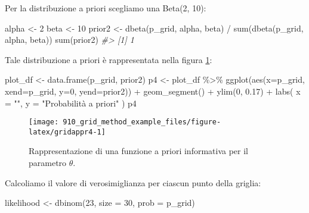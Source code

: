 \documentclass[
]{memoir}
\newenvironment{Shaded}{\begin{snugshade}}{\end{snugshade}}
\newcommand{\AttributeTok}[1]{\textcolor[rgb]{0.77,0.63,0.00}{#1}}
\newcommand{\CommentTok}[1]{\textcolor[rgb]{0.56,0.35,0.01}{\textit{#1}}}
\newcommand{\DecValTok}[1]{\textcolor[rgb]{0.00,0.00,0.81}{#1}}
\newcommand{\FloatTok}[1]{\textcolor[rgb]{0.00,0.00,0.81}{#1}}
\newcommand{\FunctionTok}[1]{\textcolor[rgb]{0.00,0.00,0.00}{#1}}
\newcommand{\NormalTok}[1]{#1}
\newcommand{\OtherTok}[1]{\textcolor[rgb]{0.56,0.35,0.01}{#1}}
\newcommand{\SpecialCharTok}[1]{\textcolor[rgb]{0.00,0.00,0.00}{#1}}
\newcommand{\StringTok}[1]{\textcolor[rgb]{0.31,0.60,0.02}{#1}}
\begin{document}
\noindent
Per la distribuzione a priori scegliamo una Beta(2, 10):

\begin{Shaded}
\begin{Highlighting}[]
\NormalTok{alpha }\OtherTok{\textless{}{-}} \DecValTok{2}
\NormalTok{beta }\OtherTok{\textless{}{-}} \DecValTok{10}
\NormalTok{prior2 }\OtherTok{\textless{}{-}} \FunctionTok{dbeta}\NormalTok{(p\_grid, alpha, beta) }\SpecialCharTok{/} \FunctionTok{sum}\NormalTok{(}\FunctionTok{dbeta}\NormalTok{(p\_grid, alpha, beta))}
\FunctionTok{sum}\NormalTok{(prior2)}
\CommentTok{\#\textgreater{} [1] 1}
\end{Highlighting}
\end{Shaded}

\noindent
Tale distribuzione a priori è rappresentata nella figura \ref{fig:gridappr4}:

\begin{Shaded}
\begin{Highlighting}[]
\NormalTok{plot\_df }\OtherTok{\textless{}{-}} \FunctionTok{data.frame}\NormalTok{(p\_grid, prior2)}
\NormalTok{p4 }\OtherTok{\textless{}{-}}\NormalTok{ plot\_df }\SpecialCharTok{\%\textgreater{}\%}
  \FunctionTok{ggplot}\NormalTok{(}\FunctionTok{aes}\NormalTok{(}\AttributeTok{x=}\NormalTok{p\_grid, }\AttributeTok{xend=}\NormalTok{p\_grid, }\AttributeTok{y=}\DecValTok{0}\NormalTok{, }\AttributeTok{yend=}\NormalTok{prior2)) }\SpecialCharTok{+}
  \FunctionTok{geom\_segment}\NormalTok{() }\SpecialCharTok{+}
  \FunctionTok{ylim}\NormalTok{(}\DecValTok{0}\NormalTok{, }\FloatTok{0.17}\NormalTok{) }\SpecialCharTok{+}
  \FunctionTok{labs}\NormalTok{(}
    \AttributeTok{x =} \StringTok{""}\NormalTok{,}
    \AttributeTok{y =} \StringTok{"Probabilità a priori"}
\NormalTok{  )}
\NormalTok{p4}
\end{Highlighting}
\end{Shaded}

\begin{figure}

{\centering \texttt{[image: 910\_grid\_method\_example\_files/figure-latex/gridappr4-1]} 

}

\caption{Rappresentazione di una funzione a priori informativa per il parametro $\theta$.}\label{fig:gridappr4}
\end{figure}

\noindent
Calcoliamo il valore di verosimiglianza per ciascun punto della griglia:

\begin{Shaded}
\begin{Highlighting}[]
\NormalTok{likelihood }\OtherTok{\textless{}{-}} \FunctionTok{dbinom}\NormalTok{(}\DecValTok{23}\NormalTok{, }\AttributeTok{size =} \DecValTok{30}\NormalTok{, }\AttributeTok{prob =}\NormalTok{ p\_grid)}
\end{Highlighting}
\end{Shaded}
\end{document}

